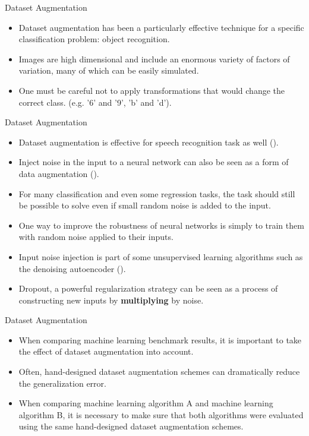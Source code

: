 \documentclass[10pt]{beamer}
\begin{document}
	\begin{frame}{Dataset Augmentation}
		\begin{itemize}
			\item Dataset augmentation has been a particularly effective technique for a specific classification problem: object recognition.
			\pause
			\item Images are high dimensional and include an enormous variety of factors of variation, many of which can be easily simulated.
			\pause
			\item One must be careful not to apply transformations that would change the correct class. (e.g. '6' and '9', 'b' and 'd').
		\end{itemize}
	\end{frame}

	\begin{frame}{Dataset Augmentation}
		\begin{itemize}
			\item Dataset augmentation is effective for speech recognition task as well (\citet{jaitly2013vocal}).
			\pause
			\item Inject noise in the input to a neural network can also be seen as a form of data augmentation (\citet{sietsma1991creating}).
			\pause
			\item For many classification and even some regression tasks, the task should still be possible to solve even if small random noise is added to the input.
			\pause
			\item One way to improve the robustness of neural networks is simply to train them with random noise applied to their inputs.
			\pause
			\item Input noise injection is part of some unsupervised learning algorithms such as the denoising autoencoder (\citet{vincent2008extracting}).
			\pause
			\item Dropout, a powerful regularization strategy can be seen as a process of constructing new inputs by \textbf{multiplying} by noise.
		\end{itemize}
	\end{frame}

	\begin{frame}{Dataset Augmentation}
		\begin{itemize}
			\item When comparing machine learning benchmark results, it is important to take the effect of dataset augmentation into account.
			\pause
			\item Often, hand-designed dataset augmentation schemes can dramatically reduce the generalization error.
			\pause
			\item When comparing machine learning algorithm A and machine learning algorithm B, it is necessary to make sure that both algorithms were evaluated using the same hand-designed dataset augmentation schemes.
		\end{itemize}
	\end{frame}
\end{document}
